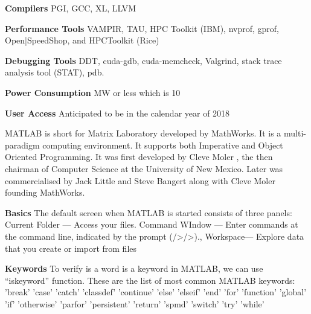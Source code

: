 \documentclass[fleqn,letterpaper,12pt]{report}
\begin{document}
\textbf{Compilers} \newline
PGI, GCC, XL, LLVM 

\textbf{Performance Tools} \newline
VAMPIR, TAU, HPC Toolkit (IBM), nvprof, gprof, Open|SpeedShop, and HPCToolkit (Rice) 

\textbf{Debugging Tools} \newline
DDT, cuda-gdb, cuda-memcheck, Valgrind, stack trace analysis tool (STAT), pdb.

\textbf{Power Consumption}  MW or less which is 10%

\textbf{User Access} \newline
Anticipated to be in the calendar year of 2018 \newline 


\vfill

%
\newpage
{}
{}
\problem
MATLAB is short for Matrix Laboratory developed by MathWorks.  It is a multi-paradigm computing environment. It supports both Imperative and Object Oriented Programming. It was first developed by Cleve Moler , the then chairman of Computer Science at the University of New Mexico. Later was commercialised by Jack Little and Steve Bangert along with Cleve Moler founding MathWorks. 

\textbf{Basics}\newline
The default screen when MATLAB is started consists of three panels:
Current Folder — Access your files. 
Command WIndow — Enter commands at the command line, indicated by the prompt (/>/>).,
Workspace— Explore data that you create or import from files

\textbf{Keywords}\newline
To verify is a word is a keyword in MATLAB, we can use “iskeyword” function.\newline
These are the list of most common MATLAB keywords:\newline
	'break'\newline
    'case'\newline
    'catch'\newline
    'classdef'\newline
    'continue'\newline
    'else'\newline
    'elseif'\newline
    'end'\newline
    'for'\newline
    'function'\newline
    'global'\newline
    'if'\newline
    'otherwise'\newline
    'parfor'\newline
    'persistent'\newline
    'return'\newline
    'spmd'\newline
    'switch'\newline
    'try'\newline
    'while'
	
\end{document}
